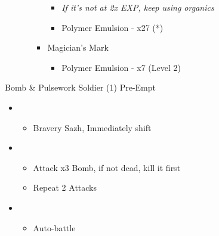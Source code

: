 \begin{multicols}{2}
\begin{upgrade}
\begin{itemize}
\begin{itemize}
\begin{itemize}
\begin{itemize}
						                  \item \textit{If it's not at 2x EXP, keep using organics}
						                  \item Polymer Emulsion - x27 (*)
					                  \end{itemize}
					            \item Magician's Mark
					                  \begin{itemize}
						                  \item Polymer Emulsion - x7 (Level 2)
					                  \end{itemize}
				            \end{itemize}
			      \end{itemize}
		\end{itemize}
	\end{upgrade}

	\begin{battle}[0:19]{Bomb \& Pulsework Soldier (1) Pre-Empt}
		\begin{itemize}
			\item \second
			      \begin{itemize}
				      \item Bravery Sazh, Immediately shift
			      \end{itemize}
			\item \third
			      \begin{itemize}
				      \item Attack x3 Bomb, if not dead, kill it first
				      \item Repeat 2  Attacks
			      \end{itemize}
			\item \first
			      \begin{itemize}
				      \item Auto-battle
			      \end{itemize}
		\end{itemize}
	\end{battle}


\end{multicols}
